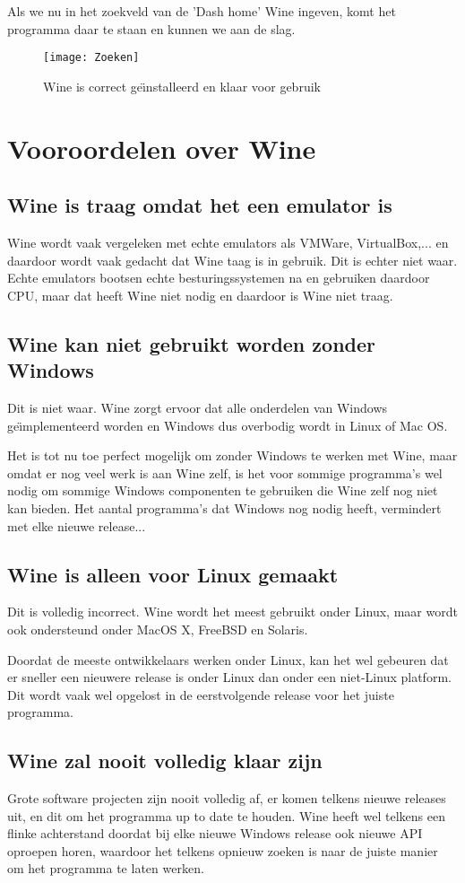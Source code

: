 \documentclass[12pt]{article}
\begin{document}
Als we nu in het zoekveld van de 'Dash home' Wine ingeven, komt het programma daar te staan en kunnen we aan de slag.
\begin{figure} [!ht]
\begin{center}
	\texttt{[image: Zoeken]}
\end{center}
	\caption{Wine is correct ge\"{\i}nstalleerd en klaar voor gebruik}
\end{figure}
\newpage
\section{Vooroordelen over Wine}
\subsection{Wine is traag omdat het een emulator is}
Wine wordt vaak vergeleken met echte emulators als VMWare, VirtualBox,... en daardoor wordt vaak gedacht dat Wine taag is in gebruik. Dit is echter niet waar. Echte emulators bootsen echte besturingssystemen na en gebruiken daardoor CPU, maar dat heeft Wine niet nodig en daardoor is Wine niet traag.
\subsection{Wine kan niet gebruikt worden zonder Windows}
Dit is niet waar. Wine zorgt ervoor dat alle onderdelen van Windows ge\"{\i}mplementeerd worden en Windows dus overbodig wordt in Linux of Mac OS. 

Het is tot nu toe perfect mogelijk om zonder Windows te werken met Wine, maar omdat er nog veel werk is aan Wine zelf, is het voor sommige programma's wel nodig om sommige Windows componenten te gebruiken die Wine zelf nog niet kan bieden. Het aantal programma's dat Windows nog nodig heeft, vermindert met elke nieuwe release...
\subsection{Wine is alleen voor Linux gemaakt}
Dit is volledig incorrect. Wine wordt het meest gebruikt onder Linux, maar wordt ook ondersteund onder MacOS X, FreeBSD en Solaris.

Doordat de meeste ontwikkelaars werken onder Linux, kan het wel gebeuren dat er sneller een nieuwere release is onder Linux dan onder een niet-Linux platform. Dit wordt vaak wel opgelost in de eerstvolgende release voor het juiste programma. 
\subsection{Wine zal nooit volledig klaar zijn}
Grote software projecten zijn nooit volledig af, er komen telkens nieuwe releases uit, en dit om het programma up to date te houden. Wine heeft wel telkens een flinke achterstand doordat bij elke nieuwe Windows release ook nieuwe API oproepen horen, waardoor het telkens opnieuw zoeken is naar de juiste manier om het programma te laten werken.
\end{document}

